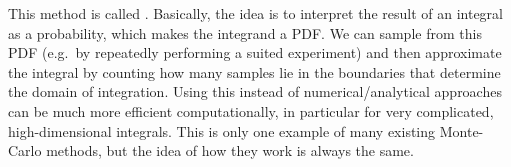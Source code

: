 This method is called . Basically, the idea is to interpret the result of an integral as a probability, which makes the integrand a PDF. We can sample from this PDF (e.g.~by repeatedly performing a suited experiment) and then approximate the integral by counting how many samples lie in the boundaries that determine the domain of integration. Using this instead of numerical/analytical approaches can be much more efficient computationally, in particular for very complicated, high-dimensional integrals. This is only one example of many existing Monte-Carlo methods, but the idea of how they work is always the same.%





